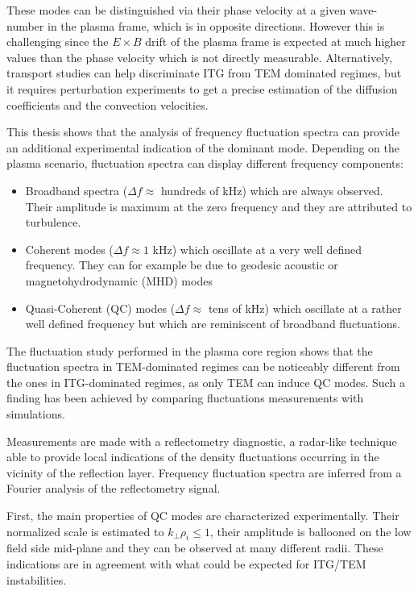 These modes can be distinguished via their phase velocity at a given wave-number in the plasma frame, which is in opposite directions. However this is challenging since the $E\times B$ drift of the plasma frame is expected at much higher values than the phase velocity which is not directly measurable. Alternatively, transport studies can help discriminate ITG from TEM dominated regimes, but it requires perturbation experiments to get a precise estimation of the diffusion coefficients and the convection velocities.

This thesis shows that the analysis of frequency fluctuation spectra can provide an additional experimental indication of the dominant mode. Depending on the plasma scenario, fluctuation spectra can display different frequency components:
\begin{itemize}
	\item Broadband spectra ($\Delta f\approx$ hundreds of kHz) which are always observed. Their amplitude is maximum at the zero frequency and they are attributed to turbulence.
	\item Coherent modes ($\Delta f\approx1$ kHz) which oscillate at a very well defined frequency. They can for example be due to geodesic acoustic or magnetohydrodynamic (MHD) modes
	\item Quasi-Coherent (QC) modes ($\Delta f\approx$ tens of kHz) which oscillate at a rather well defined frequency but which are reminiscent of broadband fluctuations.
\end{itemize}
The fluctuation study performed in the plasma core region shows that the fluctuation spectra in TEM-dominated regimes can be noticeably different from the ones in ITG-dominated regimes, as only TEM can induce QC modes. Such a finding has been achieved by comparing fluctuations measurements with simulations.

Measurements are made with a reflectometry diagnostic, a radar-like technique able to provide local indications of the density fluctuations occurring in the vicinity of the reflection layer. Frequency fluctuation spectra are inferred from a Fourier analysis of the reflectometry signal.

First, the main properties of QC modes are characterized experimentally. Their normalized scale is estimated to $k_{\perp}\rho_i\leq1$, their amplitude is ballooned on the low field side mid-plane and they can be observed at many different radii. These indications are in agreement with what could be expected for ITG/TEM instabilities.

